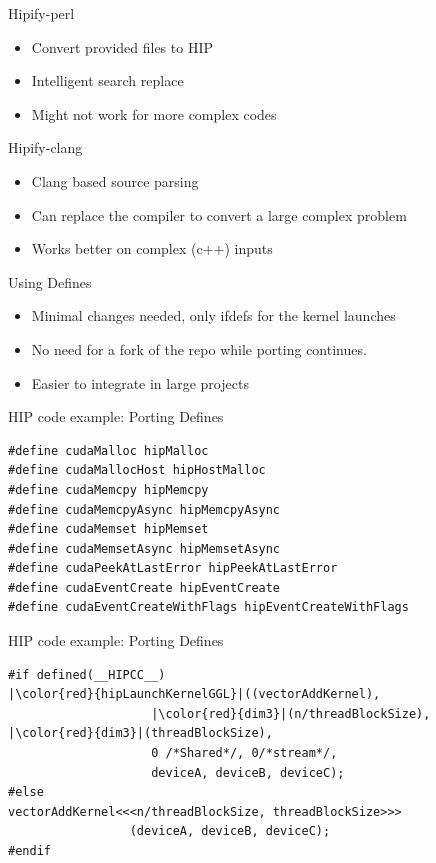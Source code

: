 \documentclass[aspectratio=169]{beamer}
\begin{document}
\begin{frame}{Hipify-perl}
\begin{itemize}
    \item Convert provided files to HIP
    \item Intelligent search replace
    \item Might not work for more complex codes
\end{itemize}

\end{frame}

\begin{frame}{Hipify-clang}
\begin{itemize}
    \item Clang based source parsing
    \item Can replace the compiler to convert a large complex problem
    \item Works better on complex (c++) inputs
\end{itemize}
\end{frame}

\begin{frame}{Using Defines}
\begin{itemize}
    \item Minimal changes needed, only ifdefs for the kernel launches 
    \item No need for a fork of the repo while porting continues.
    \item Easier to integrate in large projects
\end{itemize}
\end{frame}

\begin{frame}[fragile]{HIP code example: Porting Defines}

\begin{verbatim}
#define cudaMalloc hipMalloc
#define cudaMallocHost hipHostMalloc
#define cudaMemcpy hipMemcpy
#define cudaMemcpyAsync hipMemcpyAsync
#define cudaMemset hipMemset
#define cudaMemsetAsync hipMemsetAsync
#define cudaPeekAtLastError hipPeekAtLastError
#define cudaEventCreate hipEventCreate
#define cudaEventCreateWithFlags hipEventCreateWithFlags
\end{verbatim}
\end{frame}

\begin{frame}[fragile]{HIP code example: Porting Defines}

\begin{verbatim}
#if defined(__HIPCC__)
|\color{red}{hipLaunchKernelGGL}|((vectorAddKernel),
                    |\color{red}{dim3}|(n/threadBlockSize), |\color{red}{dim3}|(threadBlockSize),
                    0 /*Shared*/, 0/*stream*/,
                    deviceA, deviceB, deviceC);
#else
vectorAddKernel<<<n/threadBlockSize, threadBlockSize>>>
                 (deviceA, deviceB, deviceC);
#endif
\end{verbatim}
\end{frame}
\end{document}
